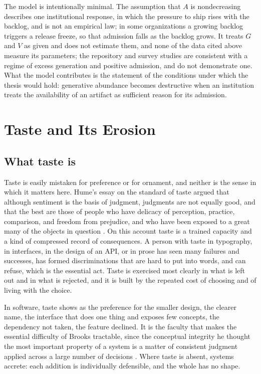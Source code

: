 \documentclass[11pt,a4paper]{article}
\theoremstyle{remark}
\begin{document}
The model is intentionally minimal. The assumption that $A$ is nondecreasing describes one institutional response, in which the pressure to ship rises with the backlog, and is not an empirical law; in some organizations a growing backlog triggers a release freeze, so that admission falls as the backlog grows. It treats $G$ and $V$ as given and does not estimate them, and none of the data cited above measure its parameters; the repository and survey studies are consistent with a regime of excess generation and positive admission, and do not demonstrate one. What the model contributes is the statement of the conditions under which the thesis would hold: generative abundance becomes destructive when an institution treats the availability of an artifact as sufficient reason for its admission.

\section{Taste and Its Erosion}

\subsection{What taste is}

Taste is easily mistaken for preference or for ornament, and neither is the sense in which it matters here. Hume's essay on the standard of taste argued that although sentiment is the basis of judgment, judgments are not equally good, and that the best are those of people who have delicacy of perception, practice, comparison, and freedom from prejudice, and who have been exposed to a great many of the objects in question \cite{Hume1757}. On this account taste is a trained capacity and a kind of compressed record of consequences. A person with taste in typography, in interfaces, in the design of an API, or in prose has seen many failures and successes, has formed discriminations that are hard to put into words, and can refuse, which is the essential act. Taste is exercised most clearly in what is left out and in what is rejected, and it is built by the repeated cost of choosing and of living with the choice.

In software, taste shows as the preference for the smaller design, the clearer name, the interface that does one thing and exposes few concepts, the dependency not taken, the feature declined. It is the faculty that makes the essential difficulty of Brooks tractable, since the conceptual integrity he thought the most important property of a system is a matter of consistent judgment applied across a large number of decisions \cite{Brooks1987}. Where taste is absent, systems accrete: each addition is individually defensible, and the whole has no shape.
\end{document}

